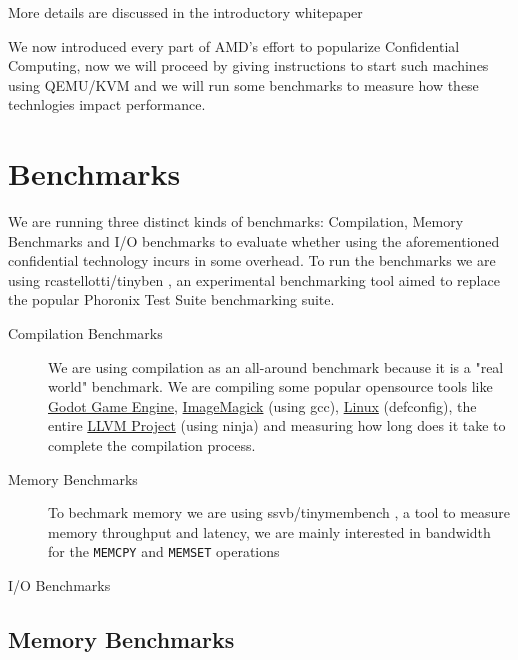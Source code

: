 \documentclass[twocolumn]{article}
\begin{document}
More details are discussed in the introductory whitepaper \cite{sev-snp}

We now introduced every part of AMD's effort to popularize Confidential Computing, now we will proceed by giving instructions to start such machines using QEMU/KVM and we will run some benchmarks to measure how these technlogies impact performance.


\section{Benchmarks}

We are running three distinct kinds of benchmarks: Compilation, Memory Benchmarks and I/O benchmarks to evaluate whether using the aforementioned confidential technology incurs in some overhead. To run the benchmarks we are using rcastellotti/tinyben \cite{tinyben}, an experimental benchmarking tool aimed to replace the popular Phoronix Test Suite \cite{pts} benchmarking suite.

\begin{description}
    \item[Compilation Benchmarks] We are using compilation as an all-around benchmark because it is a "real world" benchmark. We are compiling some popular opensource tools like \href{https://github.com/godotengine/godot}{Godot Game Engine}, \href{https://github.com/imagemagick/imagemagick}{ImageMagick} (using gcc), \href{https://git.kernel.org/pub/scm/linux/kernel/git/torvalds/linux.git}{Linux} (defconfig), the entire \href{https://github.com/llvm/llvm-project}{LLVM Project} (using ninja) and measuring how long does it take to complete the compilation process.
    \item[Memory Benchmarks] To bechmark memory we are using ssvb/tinymembench \cite{tinymembench}, a tool to measure memory throughput and latency, we are mainly interested in bandwidth for the \texttt{MEMCPY} and \texttt{MEMSET} operations
    \item[I/O Benchmarks] 
\end{description}
\subsection{}



\subsection{Memory Benchmarks}
\end{document}
